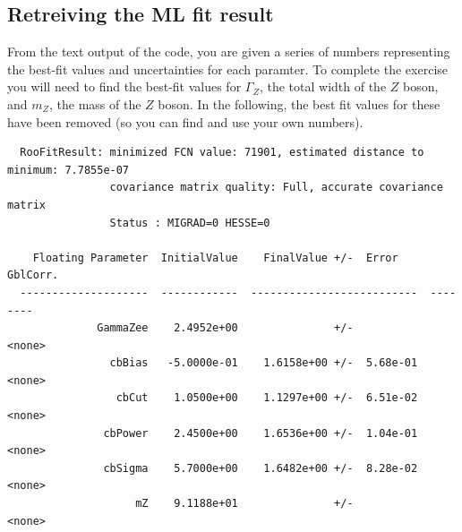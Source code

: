 \documentclass{article}
\begin{document}
\subsection{Retreiving the ML fit result}
From the text output of the code, you are given a series of numbers
representing the best-fit values and uncertainties for each
paramter. To complete the exercise you will need to find the best-fit
values for $\Gamma_Z$, the total width of the $Z$ boson, and $m_Z$,
the mass of the $Z$ boson. In the following, the best fit values for
these have been removed (so you can find and use your own numbers).
\clearpage
\begin{verbatim}
  RooFitResult: minimized FCN value: 71901, estimated distance to minimum: 7.7855e-07
                covariance matrix quality: Full, accurate covariance matrix
                Status : MIGRAD=0 HESSE=0 

    Floating Parameter  InitialValue    FinalValue +/-  Error     GblCorr.
  --------------------  ------------  --------------------------  --------
              GammaZee    2.4952e+00               +/-            <none>
                cbBias   -5.0000e-01    1.6158e+00 +/-  5.68e-01  <none>
                 cbCut    1.0500e+00    1.1297e+00 +/-  6.51e-02  <none>
               cbPower    2.4500e+00    1.6536e+00 +/-  1.04e-01  <none>
               cbSigma    5.7000e+00    1.6482e+00 +/-  8.28e-02  <none>
                    mZ    9.1188e+01               +/-             <none>
\end{verbatim}
\end{document}
